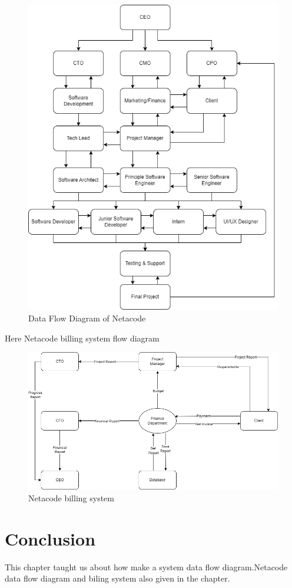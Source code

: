 \documentclass[a4paper,12pt]{report}
\begin{document}
\begin{figure}[h]
	\centering
	\includegraphics[width=0.9\linewidth]{dfd_company}
	\caption{Data Flow Diagram of Netacode}
	\label{fig:dfd_company}
\end{figure}
\newpage
Here Netacode billing system flow diagram

\begin{figure}[h]
	\centering
	\includegraphics[width=0.9\linewidth]{dfd_company2}
	\caption{Netacode billing system}
	\label{fig:dfdcompany2}
\end{figure}
\section{Conclusion}
This chapter taught us about how make a system data flow diagram.Netacode data flow diagram and biling system also given in the chapter.
\end{document}
